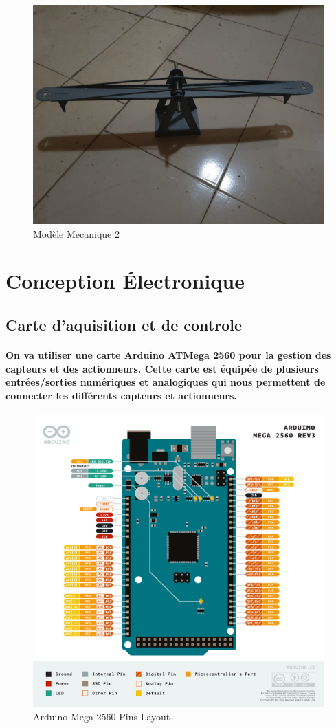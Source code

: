 \begin{figure}[!htpb]
	\centering
	\includegraphics[width=0.8\linewidth]{Figures/model-mec-2.jpeg}
	\caption{Modèle Mecanique 2}
	\label{fig:real-model-2}
\end{figure}



\section{Conception Électronique}

\subsection{Carte d'aquisition et de controle}

\paragraph{
	On va utiliser une carte Arduino ATMega 2560 pour la gestion des capteurs et des actionneurs. Cette carte est équipée de plusieurs entrées/sorties numériques et analogiques qui nous permettent de connecter les différents capteurs et actionneurs.
}

\begin{figure}[!htpb]
    \centering
    \includegraphics[width=0.6\linewidth]{Figures/arduino.png}
    \caption{Arduino Mega 2560 Pins Layout}
    \label{fig:ArduinoMega2560}
\end{figure}

